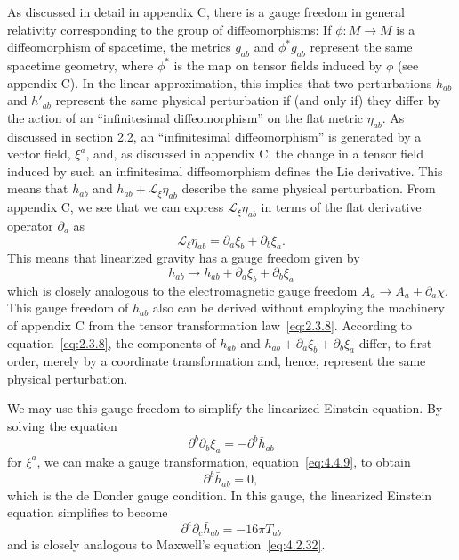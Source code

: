 As discussed in detail in appendix C, there is a gauge freedom in general relativity
corresponding to the group of diffeomorphisms: If \(\phi:M\to M\) is a
diffeomorphism of spacetime, the metrics \(g_{ab}\) and \(\phi^*g_{ab}\)
represent the same spacetime geometry, where \(\phi^*\) is the map on tensor
fields induced by \(\phi\) (see appendix C). In the linear approximation, this
implies that two perturbations \(h_{ab}\) and \(h'_{ab}\) represent the same
physical perturbation if (and only if) they differ by the action of an
``infinitesimal diffeomorphism'' on the flat metric \(\eta_{ab}\). As discussed in
section 2.2, an ``infinitesimal diffeomorphism'' is generated by a vector field,
\(\xi^a\), and, as discussed in appendix C, the change in a tensor field induced by
such an infinitesimal diffeomorphism defines the Lie derivative. This means that
\(h_{ab}\) and \(h_{ab}+\mathcal L_\xi\eta_{ab}\) describe the same physical
perturbation. From appendix C, we see that we can express
\(\mathcal L_\xi\eta_{ab}\) in terms of the flat derivative operator
\(\partial_a\) as
\begin{equation}
  \mathcal L_\xi\eta_{ab}=\partial_a\xi_b+\partial_b\xi_a .
  \tag{4.4.8}\label{eq:4.4.8}
\end{equation}
This means that linearized gravity has a gauge freedom given by
\begin{equation}
  h_{ab}\longrightarrow h_{ab}+\partial_a\xi_b+\partial_b\xi_a
  \tag{4.4.9}\label{eq:4.4.9}
\end{equation}
which is closely analogous to the electromagnetic gauge freedom
\(A_a\longrightarrow A_a+\partial_a\chi\). This gauge freedom of \(h_{ab}\)
also can be derived without employing the machinery of appendix C from the tensor
transformation law~\eqref{eq:2.3.8}. According to equation~\eqref{eq:2.3.8}, the
components of \(h_{ab}\) and
\(h_{ab}+\partial_a\xi_b+\partial_b\xi_a\) differ, to first order, merely by a
coordinate transformation and, hence, represent the same physical perturbation.

We may use this gauge freedom to simplify the linearized Einstein equation. By
solving the equation
\begin{equation}
  \partial^b\partial_b\xi_a=-\partial^b\bar h_{ab}
  \tag{4.4.10}\label{eq:4.4.10}
\end{equation}
for \(\xi^a\), we can make a gauge transformation, equation~\eqref{eq:4.4.9},
to obtain
\begin{equation}
  \partial^b\bar h_{ab}=0 ,
  \tag{4.4.11}\label{eq:4.4.11}
\end{equation}
which is the de Donder gauge condition. In this gauge, the linearized Einstein
equation simplifies to become
\begin{equation}
  \partial^c\partial_c\bar h_{ab}=-16\pi T_{ab}
  \tag{4.4.12}\label{eq:4.4.12}
\end{equation}
and is closely analogous to Maxwell's equation~\eqref{eq:4.2.32}.

